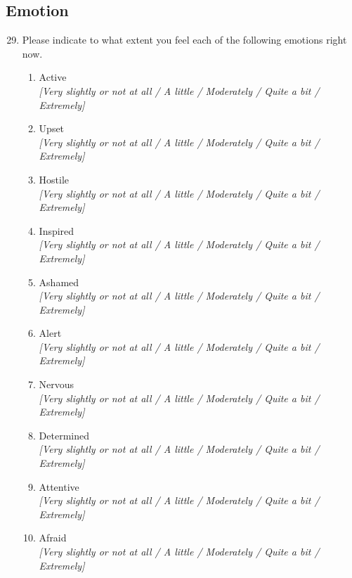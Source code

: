 \documentclass[11pt]{article}
\begin{document}
\subsection*{Emotion}
\begin{enumerate}[resume]
\setcounter{enumi}{28}
    \item Please indicate to what extent you feel each of the following emotions right now. 
    \begin{enumerate}
        \item Active\\ \textit{[Very slightly or not at all / A little / Moderately / Quite a bit / Extremely]}
        \item Upset\\ \textit{[Very slightly or not at all / A little / Moderately / Quite a bit / Extremely]}
        \item Hostile\\ \textit{[Very slightly or not at all / A little / Moderately / Quite a bit / Extremely]}
        \item Inspired\\ \textit{[Very slightly or not at all / A little / Moderately / Quite a bit / Extremely]}
        \item Ashamed\\ \textit{[Very slightly or not at all / A little / Moderately / Quite a bit / Extremely]}
        \item Alert\\ \textit{[Very slightly or not at all / A little / Moderately / Quite a bit / Extremely]}
        \item Nervous\\ \textit{[Very slightly or not at all / A little / Moderately / Quite a bit / Extremely]}
        \item Determined\\ \textit{[Very slightly or not at all / A little / Moderately / Quite a bit / Extremely]}
        \item Attentive\\ \textit{[Very slightly or not at all / A little / Moderately / Quite a bit / Extremely]}
        \item Afraid\\ \textit{[Very slightly or not at all / A little / Moderately / Quite a bit / Extremely]}
    \end{enumerate}
\end{enumerate}
\end{document}
